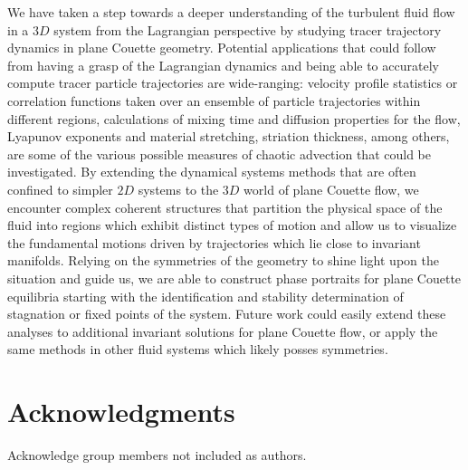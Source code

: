 \documentclass[letter,12pt,openany]{article}
\begin{document}
We have taken a step towards a deeper understanding of the  turbulent fluid flow in a $3D$ system from the Lagrangian perspective by studying tracer trajectory dynamics in plane Couette geometry.
Potential applications that could follow from having a grasp of the Lagrangian dynamics and being able to accurately compute tracer particle trajectories are wide-ranging: velocity profile statistics or correlation functions taken over an ensemble of particle trajectories within different regions, calculations of mixing time
and diffusion properties for the flow, Lyapunov exponents and material stretching,
striation thickness, among others, are some of the various possible measures of chaotic advection that could be investigated. By extending the dynamical systems methods that are often confined to simpler $2D$ systems to the $3D$ world of plane Couette flow, we encounter complex coherent structures that partition the physical space of the fluid into regions which exhibit distinct types of motion and allow us to visualize the fundamental motions driven by trajectories which lie close to invariant manifolds. Relying on the symmetries of the geometry to shine light upon the situation and guide us, we are able to construct phase portraits for plane Couette equilibria starting with the identification and stability determination of stagnation or fixed points of the system. Future work could easily extend these analyses to additional invariant solutions for plane Couette flow, or apply the same methods in other fluid systems which likely posses symmetries.


\section{\centering Acknowledgments}
Acknowledge group members not included as authors.










\end{document}
